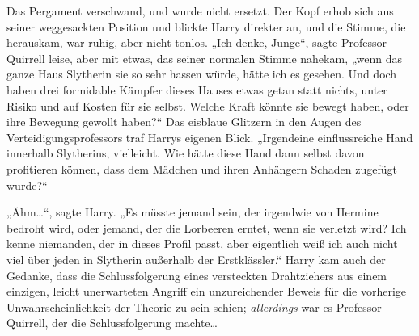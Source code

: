 Das Pergament verschwand, und wurde nicht ersetzt. Der Kopf erhob sich aus seiner weggesackten Position und blickte Harry direkter an, und die Stimme, die herauskam, war ruhig, aber nicht tonlos.
„Ich denke, Junge“, sagte Professor Quirrell leise, aber mit etwas, das seiner normalen Stimme nahekam, „wenn das ganze Haus Slytherin sie so sehr hassen würde, hätte ich es gesehen. Und doch haben drei formidable Kämpfer dieses Hauses etwas getan statt nichts, unter Risiko und auf Kosten für sie selbst. Welche Kraft könnte sie bewegt haben, oder ihre Bewegung gewollt haben?“ Das eisblaue Glitzern in den Augen des Verteidigungsprofessors traf Harrys eigenen Blick.
„Irgendeine einflussreiche Hand innerhalb Slytherins, vielleicht. Wie hätte diese Hand dann selbst davon profitieren können, dass dem Mädchen und ihren Anhängern Schaden zugefügt wurde?“

„Ähm…“, sagte Harry.
„Es müsste jemand sein, der irgendwie von Hermine bedroht wird, oder jemand, der die Lorbeeren erntet, wenn sie verletzt wird? Ich kenne niemanden, der in dieses Profil passt, aber eigentlich weiß ich auch nicht viel über jeden in Slytherin außerhalb der Erstklässler.“ Harry kam auch der Gedanke, dass die Schlussfolgerung eines versteckten Drahtziehers aus einem einzigen, leicht unerwarteten Angriff ein unzureichender Beweis für die vorherige Unwahrscheinlichkeit der Theorie zu sein schien; \emph{allerdings} war es Professor Quirrell, der die Schlussfolgerung machte…

